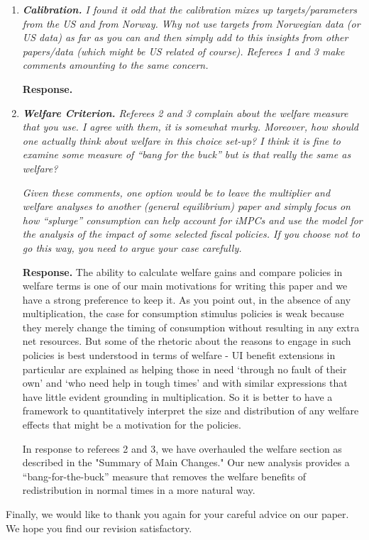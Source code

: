 \documentclass[12pt,letterpaper,english]{article}
\begin{document}
\begin{enumerate}
\begin{itemize}
\end{itemize}



\item \textit{\textbf{Calibration.} I found it odd that the calibration mixes up targets/parameters from the US and from Norway. Why not use targets from Norwegian data (or US data) as far as you can and then simply add to this insights from other papers/data
(which might be US related of course). Referees 1 and 3 make comments amounting to the same concern.}	

\noindent \textbf{Response.} 

\item \textit{\textbf{Welfare Criterion.} Referees 2 and 3 complain about the welfare measure that you use. I agree with them, it is somewhat murky. Moreover, how should one	actually think about welfare in this choice set-up? I think it is fine to examine some	measure of ``bang for the buck'' but is that really the same as welfare?} 

\textit{Given these comments, one option would be to leave the multiplier and welfare	analyses to another (general equilibrium) paper and simply focus on how ``splurge''	consumption can help account for iMPCs and use the model for the analysis of the impact of some selected fiscal policies. If you choose not to go this way, you need to argue your case carefully.}	

\noindent \textbf{Response.} The ability to calculate welfare gains and compare policies in welfare terms is one of our main motivations for writing this paper and we have a strong preference to keep it. As you point out, in the absence of any multiplication, the case for consumption stimulus policies is weak because they merely change the timing of consumption without resulting in any extra net resources. But some of the rhetoric about the reasons to engage in such policies is best understood in terms of welfare - UI benefit extensions in particular are explained as helping those in need `through no fault of their own' and `who need help in tough times' and with similar expressions that have little evident grounding in multiplication. So it is better to have a framework to quantitatively interpret the size and distribution of any welfare effects that might be a motivation for the policies.

In response to referees 2 and 3, we have overhauled the welfare section as described in the "Summary of Main Changes." Our new analysis provides a ``bang-for-the-buck'' measure that removes the welfare benefits of redistribution in normal times in a more natural way.


\end{enumerate}

\bigskip

\noindent Finally, we would like to thank you again for your careful advice on our paper. We hope you find our revision satisfactory.

%

\end{document}
